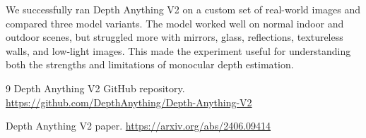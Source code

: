 \documentclass[10pt,a4paper]{article}
\begin{document}
We successfully ran Depth Anything V2 on a custom set of real-world images and compared three model variants. The model worked well on normal indoor and outdoor scenes, but struggled more with mirrors, glass, reflections, textureless walls, and low-light images. This made the experiment useful for understanding both the strengths and limitations of monocular depth estimation.

\begin{thebibliography}{9}
Depth Anything V2 GitHub repository. \url{https://github.com/DepthAnything/Depth-Anything-V2}

Depth Anything V2 paper. \url{https://arxiv.org/abs/2406.09414}
\end{thebibliography}
\end{document}
